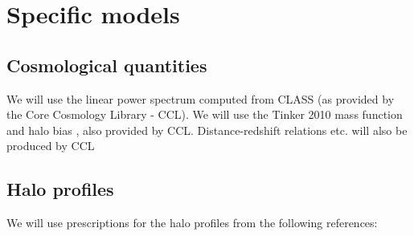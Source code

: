 \documentclass{article}
\begin{document}
\section{Specific models}
\subsection{Cosmological quantities}
We will use the linear power spectrum computed from CLASS (as provided by the Core Cosmology Library - CCL). We will use the Tinker 2010 mass function and halo bias \cite{2010ApJ...724..878T}, also provided by CCL. Distance-redshift relations etc. will also be produced by CCL

\subsection{Halo profiles}
We will use prescriptions for the halo profiles from the following references:
\end{document}
